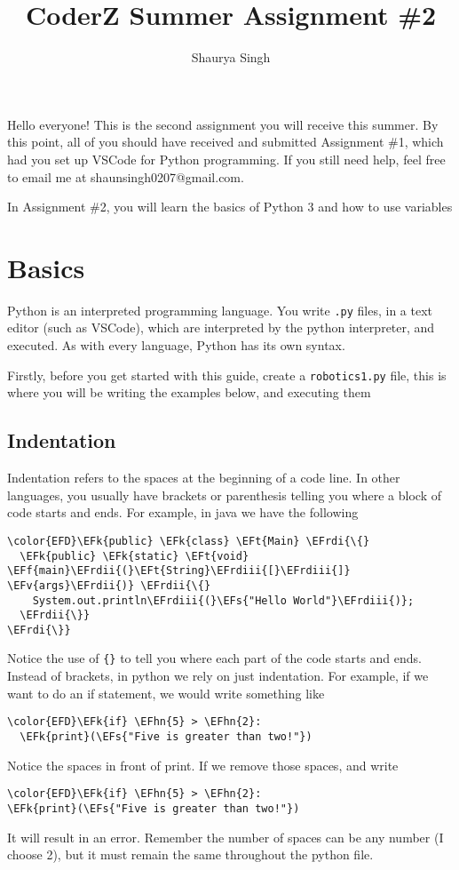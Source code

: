 \documentclass{scrartcl}
\author{Shaurya Singh}
\date{}
\title{CoderZ Summer Assignment \#2}
\newcommand{\EFk}[1]{\textcolor{EFk}{#1}} %
\newcommand{\EFt}[1]{\textcolor{EFt}{#1}} %
\newcommand{\EFs}[1]{\textcolor{EFs}{#1}} %
\newcommand{\EFv}[1]{\textcolor{EFv}{#1}} %
\newcommand{\EFf}[1]{\textcolor{EFf}{#1}} %
\newcommand{\EFhn}[1]{\textcolor{EFhn}{\textbf{#1}}} %
\newcommand{\EFrdi}[1]{\textcolor{EFrdi}{#1}} %
\newcommand{\EFrdii}[1]{\textcolor{EFrdii}{#1}} %
\newcommand{\EFrdiii}[1]{\textcolor{EFrdiii}{#1}} %
\begin{document}
\maketitle
\setcounter{tocdepth}{2}
\tableofcontents

Hello everyone! This is the second assignment you will receive this summer. By this
point, all of you should have received and submitted Assignment \#1, which had
you set up VSCode for Python programming. If you still need help, feel free to
email me at shaunsingh0207@gmail.com.

In Assignment \#2, you will learn the basics of Python 3 and how to use variables

\section{Basics}
\label{sec:org999fa5d}
Python is an interpreted programming language. You write \texttt{.py} files, in a text
editor (such as VSCode), which are interpreted by the python interpreter, and
executed. As with every language, Python has its own syntax.

Firstly, before you get started with this guide, create a \texttt{robotics1.py} file,
this is where you will be writing the examples below, and executing them

\subsection{Indentation}
\label{sec:orge43add3}
Indentation refers to the spaces at the beginning of a code line. In other
languages, you usually have brackets or parenthesis telling you where a block of
code starts and ends. For example, in java we have the following
\begin{Code}
\begin{Verbatim}[]
\color{EFD}\EFk{public} \EFk{class} \EFt{Main} \EFrdi{\{}
  \EFk{public} \EFk{static} \EFt{void} \EFf{main}\EFrdii{(}\EFt{String}\EFrdiii{[}\EFrdiii{]} \EFv{args}\EFrdii{)} \EFrdii{\{}
    System.out.println\EFrdiii{(}\EFs{"Hello World"}\EFrdiii{)};
  \EFrdii{\}}
\EFrdi{\}}
\end{Verbatim}
\end{Code}
Notice the use of \texttt{\{\}} to tell you where each part of the code starts and ends.
Instead of brackets, in python we rely on just indentation. For example, if we
want to do an if statement, we would write something like
\begin{Code}
\begin{Verbatim}[]
\color{EFD}\EFk{if} \EFhn{5} > \EFhn{2}:
  \EFk{print}(\EFs{"Five is greater than two!"})
\end{Verbatim}
\end{Code}
Notice the spaces in front of print. If we remove those spaces, and write
\begin{Code}
\begin{Verbatim}[]
\color{EFD}\EFk{if} \EFhn{5} > \EFhn{2}:
\EFk{print}(\EFs{"Five is greater than two!"})
\end{Verbatim}
\end{Code}
It will result in an error. Remember the number of spaces can be any number (I
choose 2), but it must remain the same throughout the python file.
\end{document}

